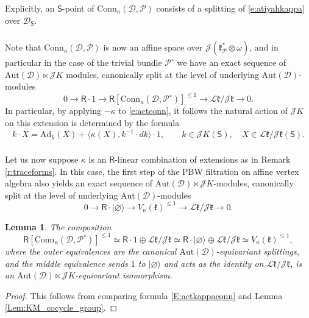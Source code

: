 \documentclass{amsart}
\newtheorem{Lem}[Thm]{Lemma}
\theoremstyle{definition}
\newcommand{\fk}{\mathfrak{k}}
\newcommand{\sss}{\subsubsection{}}
\newcommand{\sD}{\mathscr{D}}
\newcommand{\Sing}{\mathsf{S}}
\newcommand{\on}{\mathrm}
\newcommand{\Ring}{\mathsf{R}}
\newcommand{\sP}{\mathscr{P}}
\newcommand{\Jet}{\mathscr{J}}
\newcommand{\Loop}{\mathscr{L}}
\newcommand{\Conn}{\on{Conn}}
\newcommand{\Aut}{\on{Aut}}
\numberwithin{equation}{section}
\begin{document}
Explicitly, an $\Sing$-point of $\Conn_\kappa(\sD, \sP)$ consists of a splitting of \eqref{e:atiyahkappa} over $\sD_\Sing$. 

\sss Note that $\Conn_\kappa(\sD, \sP)$ is now an affine space over $\Jet (\fk^*_\sP \otimes \omega)$, and in particular in the case of the trivial bundle $\sP^\circ$ we have an exact sequence of $\Aut(\sD) \ltimes \Jet K$ modules, canonically split at the level of underlying $\Aut(\sD)$-modules 
$$0 \rightarrow \Ring \cdot 1 \rightarrow \Ring[\Conn_\kappa(\sD, \sP^\circ)]^{\leqslant 1} \rightarrow \Loop \fk / \Jet \fk \rightarrow 0.$$
In particular, by applying $-\kappa$ to \eqref{e:actconn}, it follows the natural action of $\Jet K$ on this extension is determined by the formula 
\begin{equation} \label{E:actkappaconn} k \cdot X = \on{Ad}_k(X) + \langle \kappa(X) , k^{-1} \cdot dk \rangle \cdot 1, \quad \quad k \in \Jet K(\Sing), \quad X \in \Loop \fk / \Jet \fk (\Sing) .\end{equation}

\sss Let us now suppose $\kappa$ is an $\Ring$-linear combination of extensions as in Remark \ref{r:traceforms}. In this case, the first step of the PBW filtration on affine vertex algebra also yields an exact sequence of $\Aut(\sD) \ltimes \Jet K$-modules, canonically split at the level of underlying $\Aut(\sD)$-modules
$$0 \rightarrow \Ring \cdot |\varnothing\rangle \rightarrow V_\kappa(\fk)^{\leqslant 1} \rightarrow \Loop \fk / \Jet \fk \rightarrow 0.$$

\begin{Lem} \label{l:KMvskappaconnections} The composition 
$$\Ring[\Conn_\kappa(\sD, \sP^\circ)]^{\leqslant 1} \simeq \Ring \cdot 1 \oplus \Loop \fk / \Jet \fk \simeq \Ring \cdot | \varnothing \rangle \oplus \Loop \fk / \Jet \fk \simeq V_\kappa(\fk)^{\leqslant 1},$$where the outer equivalences are the canonical $\Aut(\sD)$-equivariant splittings, and the middle equivalence sends $1$ to $| \varnothing \rangle$ and acts as the identity on $\Loop \fk / \Jet \fk$, 
is an $\Aut(\sD) \ltimes \Jet K$-equivariant isomorphism.  
\end{Lem}

\begin{proof} This follows from comparing formula \eqref{E:actkappaconn} and Lemma \ref{Lem:KM_cocycle_group}.     
\end{proof}
\end{document}
